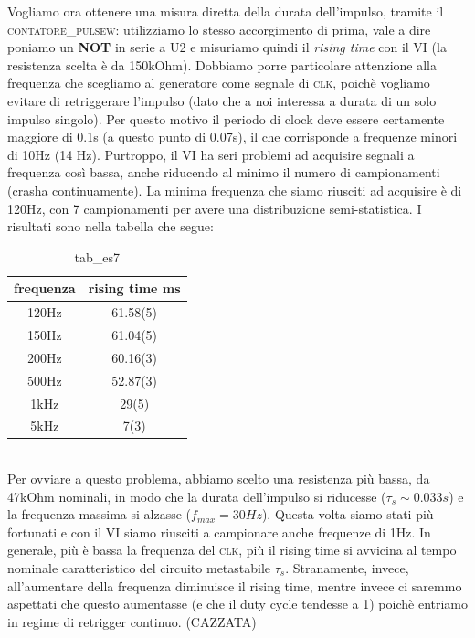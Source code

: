 \documentclass[journal, a4paper]{IEEEtran}
\begin{document}
Vogliamo ora ottenere una misura diretta della durata dell'impulso, tramite il \textsc{contatore\_pulsew}: utilizziamo lo stesso accorgimento di prima, vale a dire poniamo un \textbf{NOT} in serie a U2 e misuriamo quindi il \textit{rising time} con il VI (la resistenza scelta è da 150kOhm). Dobbiamo porre particolare attenzione alla frequenza che scegliamo al generatore come segnale di \textsc{clk}, poichè vogliamo evitare di retriggerare l'impulso (dato che a noi interessa a durata di un solo impulso singolo). Per questo motivo il periodo di clock deve essere certamente maggiore di 0.1s (a questo punto di 0.07s), il che corrisponde a frequenze minori di 10Hz (14 Hz). Purtroppo, il VI ha seri problemi ad acquisire segnali a frequenza così bassa, anche riducendo al minimo il numero di campionamenti (crasha continuamente). La minima frequenza che siamo riusciti ad acquisire è di 120Hz, con 7 campionamenti per avere una distribuzione semi-statistica. I risultati sono nella tabella che segue:\\


\begin{table}
\centering
\caption{tab\_es7}
\label{tab:es7}
{
\begin{tabular}{c|c}
\hline \textbf{frequenza} & \textbf{rising time} ms \\ 
\hline 120Hz & 61.58(5) \\ 
 150Hz & 61.04(5) \\ 
 200Hz & 60.16(3) \\ 
 500Hz & 52.87(3) \\ 
 1kHz & 29(5) \\ 
 5kHz & 7(3) \\ 
\hline 
\end{tabular}
}
\end{table}
~\\

Per ovviare a questo problema, abbiamo scelto una resistenza più bassa, da 47kOhm nominali, in modo che la durata dell'impulso si riducesse ($\tau_s \sim 0.033s$) e la frequenza massima si alzasse ($f_{max} = 30 Hz$). Questa volta siamo stati più fortunati e con il VI siamo riusciti a campionare anche frequenze di 1Hz. In generale, più è bassa la frequenza del \textsc{clk}, più il rising time si avvicina al tempo nominale caratteristico del circuito metastabile $\tau_s$. Stranamente, invece, all'aumentare della frequenza diminuisce il rising time, mentre invece ci saremmo aspettati che questo aumentasse (e che il duty cycle tendesse a 1) poichè entriamo in regime di retrigger continuo. (CAZZATA)\\
\end{document}
